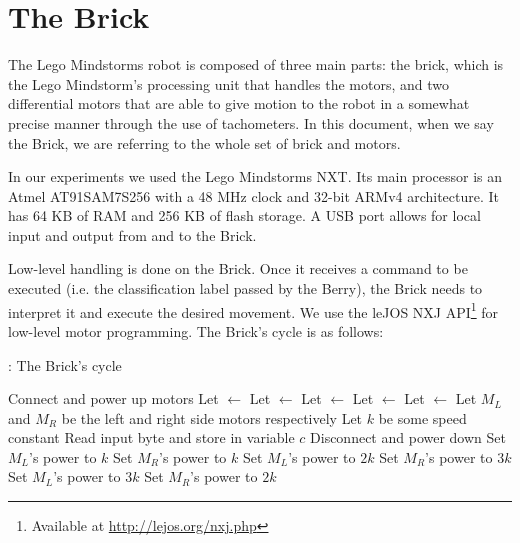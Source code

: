 \section{The Brick}

The Lego Mindstorms robot is composed of three main parts: the brick, which is the Lego Mindstorm's
processing unit that handles the motors, and two differential motors that are able to give motion
to the robot in a somewhat precise manner through the use of tachometers. In this document, when we
say the Brick, we are referring to the whole set of brick and motors.

In our experiments we used the Lego Mindstorms NXT. Its main processor is an Atmel AT91SAM7S256
with a 48 MHz clock and 32-bit ARMv4 architecture. It has 64 KB of RAM and 256 KB of flash storage.
A USB port allows for local input and output from and to the Brick.

Low-level handling is done on the Brick. Once it receives a command to be executed (i.e. the
classification label passed by the Berry), the Brick needs to interpret it and execute the desired
movement. We use the leJOS NXJ API\footnote{Available at \url{http://lejos.org/nxj.php}} for
low-level motor programming. The Brick's cycle is as follows:

\begin{algorithm}[H]
  \caption{: The Brick's cycle}
  \begin{algorithmic}[1]
    \State Connect and power up motors
    \State Let  $\gets$ 
    \State Let  $\gets$ 
    \State Let  $\gets$ 
    \State Let  $\gets$ 
    \State Let  $\gets$ 
    \State Let $M_L$ and $M_R$ be the left and right side motors respectively
    \State Let $k$ be some speed constant
        \State Read input byte and store in variable $c$
          \State Disconnect and power down
          \State Set $M_L$'s power to $k$
          \State Set $M_R$'s power to $k$
          \State Set $M_L$'s power to $2k$
          \State Set $M_R$'s power to $3k$
          \State Set $M_L$'s power to $3k$
          \State Set $M_R$'s power to $2k$
        \EndIf%
      \EndIf%
    \EndWhile%
  \end{algorithmic}
\end{algorithm}

